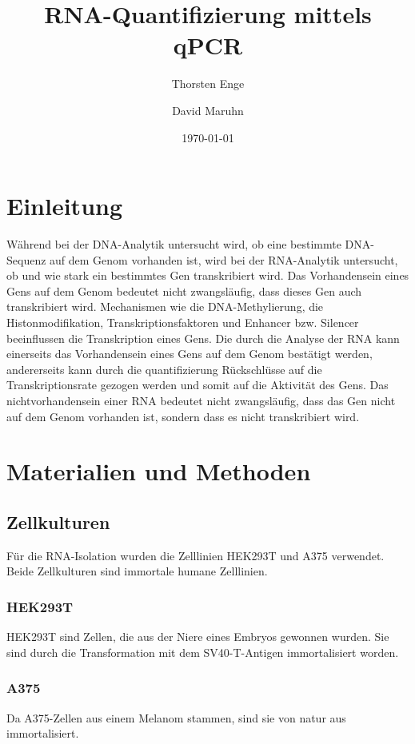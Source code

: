 \documentclass{article}
\title{RNA-Quantifizierung mittels qPCR}
\author{Thorsten Enge \and David Maruhn}
\date{\today}
\begin{document}
\maketitle

\tableofcontents
\newpage

\section{Einleitung}

Während bei der DNA-Analytik untersucht wird, ob eine bestimmte
DNA-Sequenz auf dem Genom vorhanden ist, wird bei der RNA-Analytik
untersucht, ob und wie stark ein bestimmtes Gen transkribiert wird.
Das Vorhandensein eines Gens auf dem Genom bedeutet nicht zwangsläufig,
dass dieses Gen auch transkribiert wird. Mechanismen wie die
DNA-Methylierung, die Histonmodifikation, Transkriptionsfaktoren und
Enhancer bzw. Silencer beeinflussen die Transkription eines Gens.
Die durch die Analyse der RNA kann einerseits das Vorhandensein eines
Gens auf dem Genom bestätigt werden, andererseits kann durch die
quantifizierung Rückschlüsse auf die Transkriptionsrate gezogen werden
und somit auf die Aktivität des Gens. Das nichtvorhandensein einer RNA
bedeutet nicht zwangsläufig, dass das Gen nicht auf dem Genom vorhanden
ist, sondern dass es nicht transkribiert wird.


\section{Materialien und Methoden}

\subsection*{Zellkulturen}
Für die RNA-Isolation wurden die Zelllinien HEK293T und A375 verwendet.
Beide Zellkulturen sind immortale humane Zelllinien.

\subsubsection*{HEK293T}
HEK293T sind Zellen, die aus der Niere eines Embryos gewonnen wurden.
Sie sind durch die Transformation mit dem SV40-T-Antigen immortalisiert
worden.

\subsubsection*{A375}
Da A375-Zellen aus einem Melanom stammen, sind sie von natur aus
immortalisiert.
\end{document}
